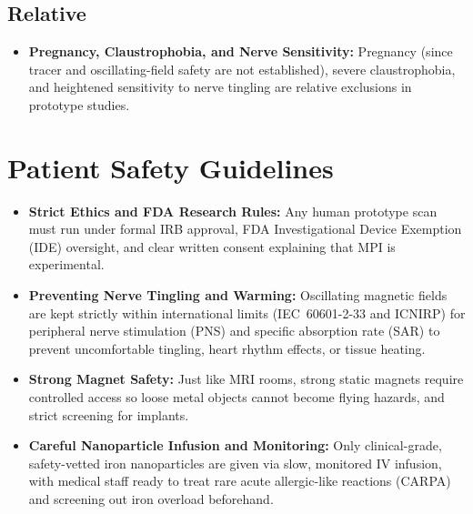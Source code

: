 \subsection{Relative}
\begin{itemize}
  \item \textbf{Pregnancy, Claustrophobia, and Nerve Sensitivity:} Pregnancy (since tracer and oscillating-field safety are not established), severe claustrophobia, and heightened sensitivity to nerve tingling are relative exclusions in prototype studies.
\end{itemize}

\section{Patient Safety Guidelines}
\begin{itemize}
  \item \textbf{Strict Ethics and FDA Research Rules:} Any human prototype scan must run under formal IRB approval, FDA Investigational Device Exemption (IDE) oversight, and clear written consent explaining that MPI is experimental.
  \item \textbf{Preventing Nerve Tingling and Warming:} Oscillating magnetic fields are kept strictly within international limits (IEC~60601-2-33 and ICNIRP) for peripheral nerve stimulation (PNS) and specific absorption rate (SAR) to prevent uncomfortable tingling, heart rhythm effects, or tissue heating.
  \item \textbf{Strong Magnet Safety:} Just like MRI rooms, strong static magnets require controlled access so loose metal objects cannot become flying hazards, and strict screening for implants.
  \item \textbf{Careful Nanoparticle Infusion and Monitoring:} Only clinical-grade, safety-vetted iron nanoparticles are given via slow, monitored IV infusion, with medical staff ready to treat rare acute allergic-like reactions (CARPA) and screening out iron overload beforehand.
\end{itemize}

